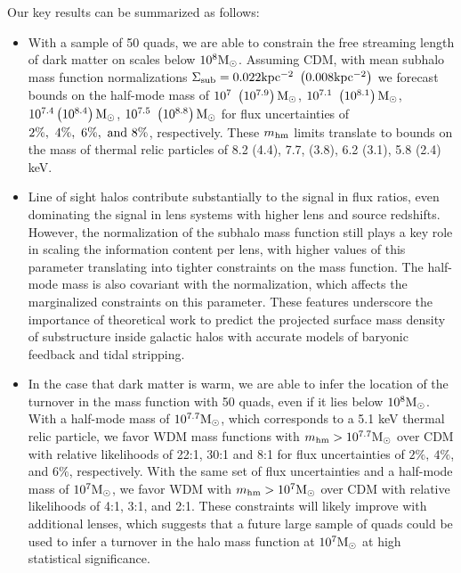 Our key results can be summarized as follows:

\begin{itemize}
	\item With a sample of 50 quads, we are able to constrain the free streaming length of dark matter on scales below $10^8 {\rm{M}_{\odot}}$. Assuming CDM, with mean subhalo mass function normalizations $\Sigma_{\rm{sub}} = 0.022 \rm{kpc^{-2}} \ \left(0.008 \rm{kpc^{-2}}\right)$ we forecast bounds on the half-mode mass of $10^{7} \ \left(10^{7.9}\right) {\rm{M}_{\odot}}$, $10^{7.1} \ \left(10^{8.1}\right) {\rm{M}_{\odot}}$, $10^{7.4} \left(10^{8.4}\right) {\rm{M}_{\odot}}$, $10^{7.5} \ \left(10^{8.8}\right) {\rm{M}_{\odot}}$ for flux uncertainties of $2 \% ,\ 4\%, \ 6\%, \ \rm{and} \ 8\%$, respectively. These ${m_{\rm{hm}}}$ limits translate to bounds on the mass of thermal relic particles of 8.2 (4.4), 7.7, (3.8), 6.2 (3.1), 5.8 (2.4) keV. 
	\item Line of sight halos contribute substantially to the signal in flux ratios, even dominating the signal in lens systems with higher lens and source redshifts. However, the normalization of the subhalo mass function still plays a key role in scaling the information content per lens, with higher values of this parameter translating into tighter constraints on the mass function. The half-mode mass is also covariant with the normalization, which affects the marginalized constraints on this parameter. These features underscore the importance of theoretical work to predict the projected surface mass density of substructure inside galactic halos with accurate models of baryonic feedback and tidal stripping.
	\item In the case that dark matter is warm, we are able to infer the location of the turnover in the mass function with 50 quads, even if it lies below $10^8 {\rm{M}_{\odot}}$. With a half-mode mass of $10^{7.7} {\rm{M}_{\odot}}$, which corresponds to a 5.1 keV thermal relic particle, we favor WDM mass functions with ${m_{\rm{hm}}} > 10^{7.7}{\rm{M}_{\odot}}$ over CDM with relative likelihoods of 22:1, 30:1 and 8:1 for flux uncertainties of $2 \% ,\ 4\%$, and $6\%$, respectively. With the same set of flux uncertainties and a half-mode mass of $10^{7} {\rm{M}_{\odot}}$, we favor WDM with ${m_{\rm{hm}}} > 10^{7}{\rm{M}_{\odot}}$ over CDM with relative likelihoods of 4:1, 3:1, and 2:1. These constraints will likely improve with additional lenses, which suggests that a future large sample of quads could be used to infer a turnover in the halo mass function at $10^{7} {\rm{M}_{\odot}}$ at high statistical significance.  
\end{itemize}

